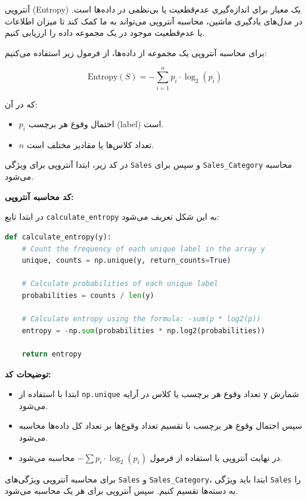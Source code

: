 \documentclass{article}
\begin{document}
آنتروپی (Entropy) یک معیار برای اندازه‌گیری عدم‌قطعیت یا بی‌نظمی در داده‌ها است. در مدل‌های یادگیری ماشین، محاسبه آنتروپی می‌تواند به ما کمک کند تا میزان اطلاعات یا عدم‌قطعیت موجود در یک مجموعه داده را ارزیابی کنیم.

برای محاسبه آنتروپی یک مجموعه از داده‌ها، از فرمول زیر استفاده می‌کنیم:

\[
\text{Entropy}(S) = - \sum_{i=1}^{n} p_i \cdot \log_2(p_i)
\]

که در آن:
\begin{itemize}
    \item \( p_i \) احتمال وقوع هر برچسب (label) است.
    \item \( n \) تعداد کلاس‌ها یا مقادیر مختلف است.
\end{itemize}

در کد زیر، ابتدا آنتروپی برای ویژگی \texttt{Sales} و سپس برای \texttt{Sales\_Category} محاسبه می‌شود.

\textbf{کد محاسبه آنتروپی:}

در ابتدا تابع \texttt{calculate\_entropy} به این شکل تعریف می‌شود:

\begin{lstlisting}[language=Python]
def calculate_entropy(y):
    # Count the frequency of each unique label in the array y
    unique, counts = np.unique(y, return_counts=True)

    # Calculate probabilities of each unique label
    probabilities = counts / len(y)

    # Calculate entropy using the formula: -sum(p * log2(p))
    entropy = -np.sum(probabilities * np.log2(probabilities))

    return entropy
\end{lstlisting}

\textbf{توضیحات کد:}
\begin{itemize}
    \item ابتدا با استفاده از \texttt{np.unique} تعداد وقوع هر برچسب یا کلاس در آرایه \texttt{y} شمارش می‌شود.
    \item سپس احتمال وقوع هر برچسب با تقسیم تعداد وقوع‌ها بر تعداد کل داده‌ها محاسبه می‌شود.
    \item در نهایت آنتروپی با استفاده از فرمول \(- \sum p_i \cdot \log_2(p_i)\) محاسبه می‌شود.
\end{itemize}

برای محاسبه آنتروپی ویژگی‌های \texttt{Sales} و \texttt{Sales\_Category}، ابتدا باید ویژگی \texttt{Sales} را به دسته‌ها تقسیم کنیم. سپس آنتروپی برای هر یک محاسبه می‌شود.
\end{document}
